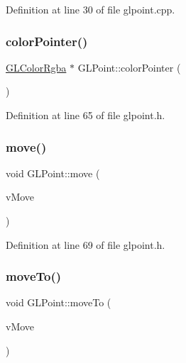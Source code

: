 Definition at line 30 of file glpoint.\+cpp.

\mbox{\label{class_g_l_point_a86adf137055461d018700894c4c5f377}} 
\subsubsection{\texorpdfstring{colorPointer()}{colorPointer()}}
{\footnotesize\ttfamily \mbox{\hyperlink{class_g_l_color_rgba}{G\+L\+Color\+Rgba}} $\ast$ G\+L\+Point\+::color\+Pointer (\begin{DoxyParamCaption}{ }\end{DoxyParamCaption})\hspace{0.3cm}{\ttfamily [inline]}}



Definition at line 65 of file glpoint.\+h.

\mbox{\label{class_g_l_point_adf9e0baf9c965a9642f34672e6564e9a}} 
\subsubsection{\texorpdfstring{move()}{move()}}
{\footnotesize\ttfamily void G\+L\+Point\+::move (\begin{DoxyParamCaption}\item[{Q\+Vector3D}]{v\+Move }\end{DoxyParamCaption})\hspace{0.3cm}{\ttfamily [inline]}}



Definition at line 69 of file glpoint.\+h.

\mbox{\label{class_g_l_point_ab85d8d026e488d1c28fdb00c1ab9ad12}} 
\subsubsection{\texorpdfstring{moveTo()}{moveTo()}}
{\footnotesize\ttfamily void G\+L\+Point\+::move\+To (\begin{DoxyParamCaption}\item[{Q\+Vector3D}]{v\+Move }\end{DoxyParamCaption})}



